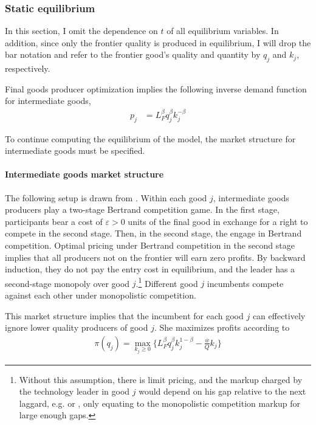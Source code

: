 \documentclass[11pt,english]{article}
\begin{document}
\subsubsection{Static equilibrium}

In this section, I omit the dependence on $t$ of all equilibrium variables. In addition, since only the frontier quality is produced in equilibrium, I will drop the bar notation and refer to the frontier good's quality and quantity by $q_j$ and $k_j$, respectively.

Final goods producer optimization implies the following inverse demand function for intermediate goods, 
\begin{align*}
p_j &= L_F^{\beta} q_j^{\beta} k_j^{-\beta}	
\end{align*}

To continue computing the equilibrium of the model, the market structure for intermediate goods must be specified. 

\paragraph{Intermediate goods market structure} The following setup is drawn from \cite{akcigit_growth_2018}. Within each good $j$, intermediate goods producers play a two-stage Bertrand competition game. In the first stage, participants bear a cost of $\varepsilon > 0$ units of the final good in exchange for a right to compete in the second stage. Then, in the second stage, the engage in Bertrand competition. Optimal pricing under Bertrand competition in the second stage implies that all producers not on the frontier will earn zero profits. By backward induction, they do not pay the entry cost in equilibrium, and the leader has a second-stage monopoly over good $j$.\footnote{Without this assumption, there is limit pricing, and the markup charged by the technology leader in good $j$ would depend on his gap relative to the next laggard, e.g. \cite{baslandze_spinout_2019} or \cite{aghion_competition_2005}, only equating to the monopolistic competition markup for large enough gaps.} Different good $j$ incumbents compete against each other under monopolistic competition.

This market structure implies that the incumbent for each good $j$ can effectively ignore lower quality producers of good $j$. She maximizes profits according to
\begin{align}
\pi(q_j) = \max_{k_j \ge 0} \Big\{ L_F^{\beta} q_j^{\beta} k_j^{1-\beta} - \frac{\overline{w}}{Q} k_j \Big\} \label{incumbent_profit}
\end{align}
\end{document}

